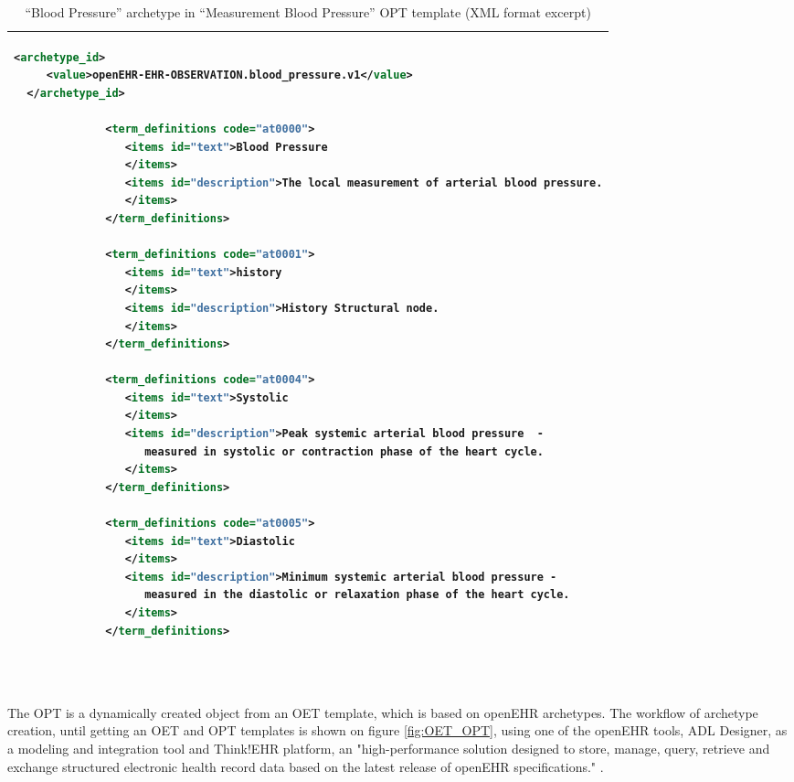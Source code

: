 \documentclass[mim_thesis.tex]{subfiles}
\begin{document}
\begin{table}[H]
	\centering
\caption{“Blood Pressure” archetype in “Measurement Blood Pressure” OPT template (XML format excerpt)}
\label{tab:bp_opt}
\begin{tabular}{l}
\toprule[2pt]
\begin{lstlisting}[language=XML]
  <archetype_id>
     <value>openEHR-EHR-OBSERVATION.blood_pressure.v1</value>
  </archetype_id>
  
              <term_definitions code="at0000">
                 <items id="text">Blood Pressure
                 </items>
                 <items id="description">The local measurement of arterial blood pressure.
                 </items>
              </term_definitions>
              
              <term_definitions code="at0001">
                 <items id="text">history
                 </items>
                 <items id="description">History Structural node.
                 </items>
              </term_definitions>
              
              <term_definitions code="at0004">
                 <items id="text">Systolic
                 </items>
                 <items id="description">Peak systemic arterial blood pressure  - 
                 	measured in systolic or contraction phase of the heart cycle.
                 </items>
              </term_definitions>
              
              <term_definitions code="at0005">
                 <items id="text">Diastolic
                 </items>
                 <items id="description">Minimum systemic arterial blood pressure - 
                 	measured in the diastolic or relaxation phase of the heart cycle.
                 </items>
              </term_definitions>
              
              
\end{lstlisting}
\tabularnewline \bottomrule[2pt]
\end{tabular}
\end{table}

The OPT is a dynamically created object from an OET template, which is based on openEHR archetypes. The workflow of archetype creation, until getting an OET and OPT templates is shown on figure \ref{fig:OET_OPT}, using one of the openEHR tools, ADL Designer, as a modeling and integration tool and Think!EHR platform, an "high-performance solution designed to store, manage, query, retrieve and exchange structured electronic health record data based on the latest release of openEHR specifications." \citep{t!ehr}.
\end{document}
